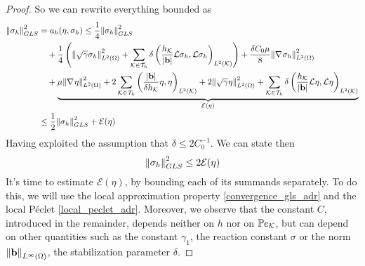 \begin{proof}
    So we can rewrite everything bounded as 
    \begin{align*}
        \norm{\sigma_h}^2_{GLS} &= a_h(\eta, \sigma_h) \leq \frac{1}{4} \norm{\sigma_h}^2_{GLS} \\
        &\quad + \frac{1}{4} \left( \norm{\sqrt{\gamma}\sigma_h}_{L^2(\Omega)}^2 + \sum_{\mathcal{K}\in\mathcal{T}_h} \delta \left( \frac{h_{\mathcal{K}}}{\abs{\textbf{b}}} \mathcal{L}\sigma_h,\mathcal{L} \sigma_h \right)_{L^2(\mathcal{K})} \right) + \frac{\delta C_0 \mu}{8} \norm{\nabla\mspace{1mu} \sigma_h}_{L^2(\Omega)}^2 \\
        &\quad + \underbrace{\mu\norm{\nabla\mspace{1mu} \eta}_{L^2(\Omega)}^2 + 2 \sum_{\mathcal{K}\in\mathcal{T}_h} \left( \frac{\abs{\textbf{b}}}{\delta h_{\mathcal{K}}} \eta, \eta \right)_{L^2(\mathcal{K})} + 2 \norm{\sqrt{\gamma}\eta}_{L^2(\Omega)}^2 + \sum_{\mathcal{K}\in\mathcal{T}_h} \delta \left( \frac{h_{\mathcal{K}}}{\abs{\textbf{b}}} \mathcal{L}\eta, \mathcal{L}\eta \right)_{L^2(\mathcal{K})}}_{\mathcal{E}(\eta)} \\
        &\leq \frac{1}{2} \norm{\sigma_h}_{GLS}^2 + \mathcal{E}(\eta)
    \end{align*}
    Having exploited the assumption that \(\delta \leq 2C^{-1}_0\). We can state then
    \[
        \norm{\sigma_h}_{GLS}^2 \leq 2\mathcal{E}(\eta)
    \]
    It's time to estimate \(\mathcal{E}(\eta)\), by bounding each of its summands separately. To do this, we will use the local approximation property \eqref{convergence_gls_adr} and the local Péclet \eqref{local_peclet_adr}. Moreover, we observe that the constant \(C\), introduced in the remainder, depends neither on \(h\) nor on \(\mathbb{P}e_{\mathcal{K}}\), but can depend on other quantities such as the constant \(\gamma_1\), the reaction constant \(\sigma\) or the norm \(\norm{\textbf{b}}_{L^\infty(\Omega)}\), the stabilization parameter \(\delta\).


\end{proof}

